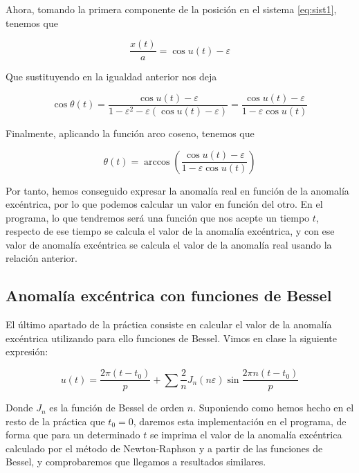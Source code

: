 \documentclass[12pt]{article}
\begin{document}
Ahora, tomando la primera componente de la posición en el sistema
\ref{eq:sist1}, tenemos que

\[
\frac{x(t)}{a} = \cos{u(t)} - \varepsilon
\]

Que sustituyendo en la igualdad anterior nos deja

\[
\cos{\theta(t)} = \frac{\cos{u(t)} - \varepsilon}{1 - \varepsilon^2 -
  \varepsilon(\cos{u(t)} - \varepsilon)} = \frac{\cos{u(t)} -
  \varepsilon}{1 - \varepsilon\cos{u(t)}}
\]

Finalmente, aplicando la función arco coseno, tenemos que

\[
\theta(t) = \arccos\left(\frac{\cos{u(t)} - \varepsilon}{1 -
    \varepsilon\cos{u(t)}}\right)
\]

Por tanto, hemos conseguido expresar la anomalía real en función
de la anomalía excéntrica, por lo que podemos calcular un valor
en función del otro. En el programa, lo que tendremos será una
función que nos acepte un tiempo $t$, respecto de ese tiempo se
calcula el valor de la anomalía excéntrica, y con ese valor de
anomalía excéntrica se calcula el valor de la anomalía real usando
la relación anterior.

\subsection{Anomalía excéntrica con funciones de Bessel}

El último apartado de la práctica consiste en calcular el valor de la
anomalía excéntrica utilizando para ello funciones de Bessel.  Vimos
en clase la siguiente expresión:

\[
u(t) = \frac{2 \pi (t - t_0)}{p} + \sum \frac{2}{n} J_n(n\varepsilon)
\sin{\frac{2 \pi n(t - t_0)}{p}}
\]

Donde $J_n$ es la función de Bessel de orden $n$. Suponiendo como
hemos hecho en el resto de la práctica que $t_0 = 0$, daremos esta
implementación en el programa, de forma que para un determinado $t$ se
imprima el valor de la anomalía excéntrica calculado por el método
de Newton-Raphson y a partir de las funciones de Bessel, y comprobaremos
que llegamos a resultados similares.
\end{document}
